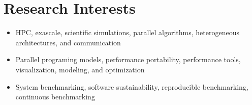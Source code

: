 \section{Research Interests}
\begin{itemize}
\item HPC, exascale, scientific simulations, parallel algorithms, heterogeneous architectures, and communication
\item Parallel programing models, performance portability, performance tools, visualization, modeling, and optimization
\item System benchmarking, software sustainability, reproducible benchmarking, continuous benchmarking
\end{itemize}

